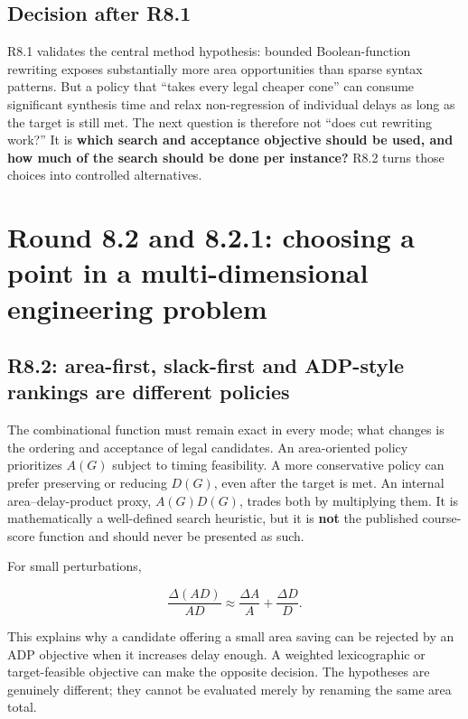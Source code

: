 \subsection{Decision after R8.1}\label{decision-after-r8.1}

R8.1 validates the central method hypothesis: bounded Boolean-function rewriting exposes substantially more area opportunities than sparse syntax patterns. But a policy that ``takes every legal cheaper cone'' can consume significant synthesis time and relax non-regression of individual delays as long as the target is still met. The next question is therefore not ``does cut rewriting work?'' It is \textbf{which search and acceptance objective should be used, and how much of the search should be done per instance?} R8.2 turns those choices into controlled alternatives.

\section{Round 8.2 and 8.2.1: choosing a point in a multi-dimensional engineering problem}\label{round-8.2-and-8.2.1-choosing-a-point-in-a-multi-dimensional-engineering-problem}

\subsection{R8.2: area-first, slack-first and ADP-style rankings are different policies}\label{r8.2-area-first-slack-first-and-adp-style-rankings-are-different-policies}

The combinational function must remain exact in every mode; what changes is the ordering and acceptance of legal candidates. An area-oriented policy prioritizes \(A(G)\) subject to timing feasibility. A more conservative policy can prefer preserving or reducing \(D(G)\), even after the target is met. An internal area--delay-product proxy, \(A(G)D(G)\), trades both by multiplying them. It is mathematically a well-defined search heuristic, but it is \textbf{not} the published course-score function and should never be presented as such.

For small perturbations,

\[
\frac{\Delta(AD)}{AD}\approx\frac{\Delta A}{A}+\frac{\Delta D}{D}.
\]

This explains why a candidate offering a small area saving can be rejected by an ADP objective when it increases delay enough. A weighted lexicographic or target-feasible objective can make the opposite decision. The hypotheses are genuinely different; they cannot be evaluated merely by renaming the same area total.

